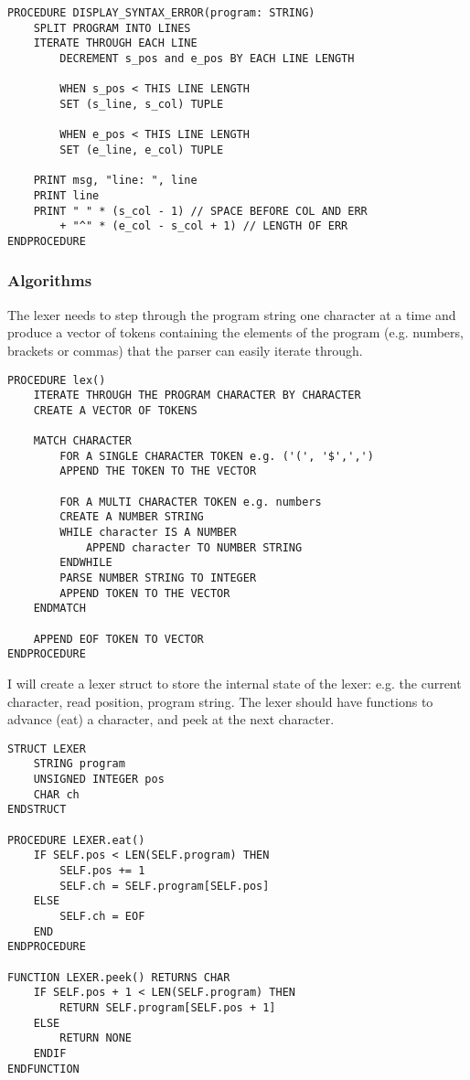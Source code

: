 \begin{lstlisting}
PROCEDURE DISPLAY_SYNTAX_ERROR(program: STRING)
    SPLIT PROGRAM INTO LINES
    ITERATE THROUGH EACH LINE 
        DECREMENT s_pos and e_pos BY EACH LINE LENGTH 

        WHEN s_pos < THIS LINE LENGTH 
        SET (s_line, s_col) TUPLE

        WHEN e_pos < THIS LINE LENGTH
        SET (e_line, e_col) TUPLE

    PRINT msg, "line: ", line
    PRINT line 
    PRINT " " * (s_col - 1) // SPACE BEFORE COL AND ERR
        + "^" * (e_col - s_col + 1) // LENGTH OF ERR
ENDPROCEDURE
\end{lstlisting}

\subsubsection{Algorithms}
The lexer needs to step through the program string one character at a time and produce a vector of tokens containing the elements of the program (e.g. numbers, brackets or commas) that the parser can easily iterate through. 

\begin{lstlisting}
PROCEDURE lex() 
    ITERATE THROUGH THE PROGRAM CHARACTER BY CHARACTER
    CREATE A VECTOR OF TOKENS
    
    MATCH CHARACTER 
        FOR A SINGLE CHARACTER TOKEN e.g. ('(', '$',',')
        APPEND THE TOKEN TO THE VECTOR

        FOR A MULTI CHARACTER TOKEN e.g. numbers
        CREATE A NUMBER STRING
        WHILE character IS A NUMBER 
            APPEND character TO NUMBER STRING 
        ENDWHILE 
        PARSE NUMBER STRING TO INTEGER 
        APPEND TOKEN TO THE VECTOR
    ENDMATCH

    APPEND EOF TOKEN TO VECTOR
ENDPROCEDURE
\end{lstlisting}

I will create a lexer struct to store the internal state of the lexer: e.g. the current character, read position, program string. The lexer should have functions to advance (eat) a character, and peek at the next character.

\begin{lstlisting}
STRUCT LEXER 
    STRING program
    UNSIGNED INTEGER pos 
    CHAR ch
ENDSTRUCT

PROCEDURE LEXER.eat() 
    IF SELF.pos < LEN(SELF.program) THEN 
        SELF.pos += 1 
        SELF.ch = SELF.program[SELF.pos]
    ELSE 
        SELF.ch = EOF 
    END
ENDPROCEDURE

FUNCTION LEXER.peek() RETURNS CHAR
    IF SELF.pos + 1 < LEN(SELF.program) THEN 
        RETURN SELF.program[SELF.pos + 1]
    ELSE 
        RETURN NONE
    ENDIF
ENDFUNCTION
\end{lstlisting}

